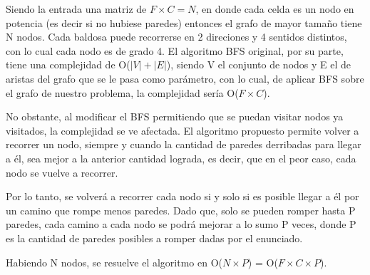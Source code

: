 Siendo la entrada una matriz de $F \times C = N$, en donde cada celda es un nodo en potencia (es decir si no hubiese paredes) entonces el grafo de mayor tamaño tiene N nodos. Cada baldosa puede recorrerse en 2 direciones y 4 sentidos distintos, con lo cual cada nodo es de grado 4. El algoritmo BFS original, por su parte, tiene una complejidad de O($|V|+|E|$), siendo V el conjunto de nodos y E el de aristas del grafo que se le pasa como parámetro, con lo cual, de aplicar BFS sobre el grafo de nuestro problema, la complejidad sería O($F \times C$).

No obstante, al modificar el BFS permitiendo que se puedan visitar nodos ya visitados, la complejidad se ve afectada. El algoritmo propuesto permite volver a recorrer un nodo, siempre y cuando la cantidad de paredes derribadas para llegar a él, sea mejor a la anterior cantidad lograda, es decir, que en el peor caso, cada nodo se vuelve a recorrer.

Por lo tanto, se volver\'a a recorrer cada nodo si y solo si es posible llegar a él por un camino que rompe menos paredes. Dado que, solo se pueden romper hasta P paredes, cada camino a cada nodo se podr\'a mejorar a lo sumo P veces, donde P es la cantidad de paredes posibles a romper dadas por el enunciado.











 Habiendo N nodos, se resuelve el algoritmo en O($N \times P$) = O($F \times C \times P$).
